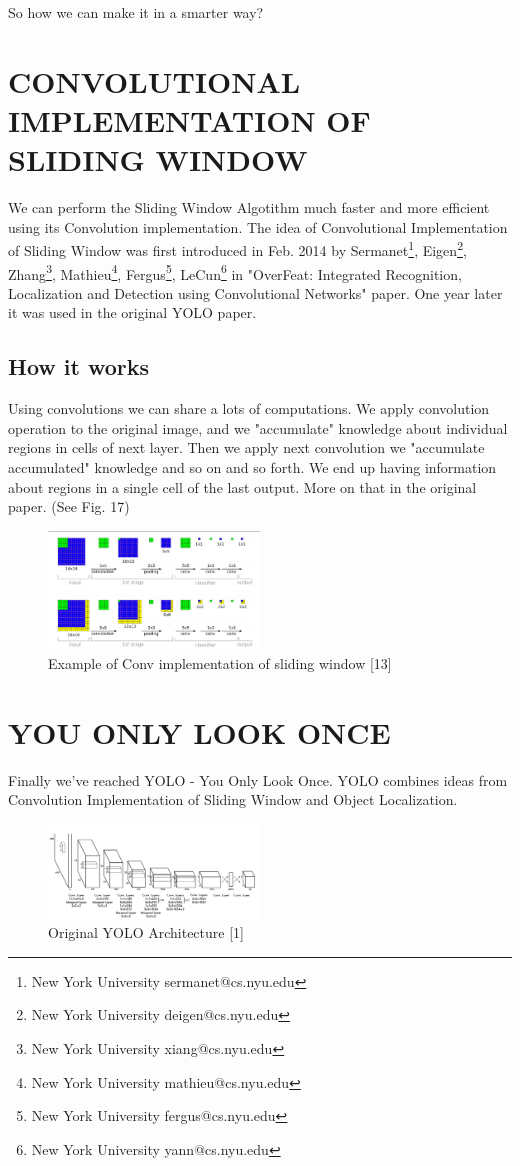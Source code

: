 \documentclass[letterpaper, 10 pt, conference]{ieeeconf}  %
\begin{document}
So how we can make it in a smarter way?


\section{CONVOLUTIONAL IMPLEMENTATION OF SLIDING WINDOW}
We can perform the Sliding Window Algotithm much faster and more efficient using its Convolution implementation. The idea of Convolutional Implementation of Sliding Window was first introduced in Feb. 2014 by Sermanet\footnote{New York University sermanet@cs.nyu.edu},  Eigen\footnote{New York University deigen@cs.nyu.edu}, Zhang\footnote{New York University xiang@cs.nyu.edu}, Mathieu\footnote{New York University mathieu@cs.nyu.edu}, Fergus\footnote{New York University fergus@cs.nyu.edu}, LeCun\footnote{New York University yann@cs.nyu.edu}  in "OverFeat: Integrated Recognition, Localization and Detection using Convolutional Networks" paper. One year later it was used in the original YOLO paper. 

\subsection{How it works}
Using convolutions we can share a lots of computations. We apply convolution operation to the original image, and we "accumulate" knowledge about individual regions in cells of next layer. Then we apply next convolution we "accumulate accumulated" knowledge and so on and so forth. We end up having information about regions in a single cell of the last output. More on that in the original paper. (See Fig. 17) 

\begin{figure}[!ht]
	\centering
    \includegraphics[width=0.5\textwidth]{Pictures/Convlutional_sliding_window.png}
	\caption{Example of Conv implementation of sliding window [13]}
\end{figure}

\section{YOU ONLY LOOK ONCE}
Finally we've reached YOLO - You Only Look Once. YOLO combines ideas from Convolution Implementation of Sliding Window and Object Localization.
\begin{figure}[!ht]
	\centering
    \includegraphics[width=0.5\textwidth]{Pictures/YOLO_architecture.png}
	\caption{Original YOLO Architecture [1]}
\end{figure}
\end{document}
